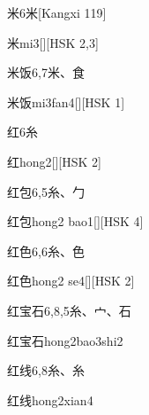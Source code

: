 \begin{entry}{米}{6}{⽶}[Kangxi 119]
  \begin{phonetics}{米}{mi3}[][HSK 2,3]
  \end{phonetics}
\end{entry}

\begin{entry}{米饭}{6,7}{⽶、⾷}
  \begin{phonetics}{米饭}{mi3fan4}[][HSK 1]
  \end{phonetics}
\end{entry}

\begin{entry}{红}{6}{⽷}
  \begin{phonetics}{红}{hong2}[][HSK 2]
  \end{phonetics}
\end{entry}

\begin{entry}{红包}{6,5}{⽷、⼓}
  \begin{phonetics}{红包}{hong2 bao1}[][HSK 4]
  \end{phonetics}
\end{entry}

\begin{entry}{红色}{6,6}{⽷、⾊}
  \begin{phonetics}{红色}{hong2 se4}[][HSK 2]
  \end{phonetics}
\end{entry}

\begin{entry}{红宝石}{6,8,5}{⽷、⼧、⽯}
  \begin{phonetics}{红宝石}{hong2bao3shi2}
  \end{phonetics}
\end{entry}

\begin{entry}{红线}{6,8}{⽷、⽷}
  \begin{phonetics}{红线}{hong2xian4}
  \end{phonetics}
\end{entry}

